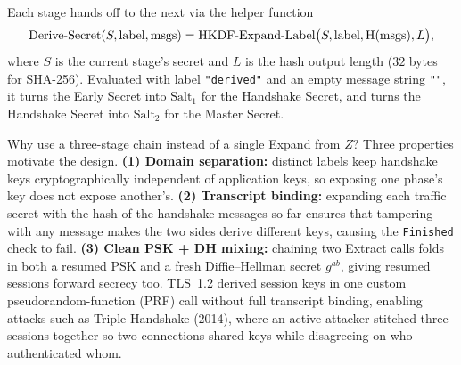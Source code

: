 Each stage hands off to the next via the helper function
\[
\operatorname{Derive\text{-}Secret}(S, \text{label}, \text{msgs})
= \operatorname{HKDF\text{-}Expand\text{-}Label}\bigl(S, \text{label}, \operatorname{H}(\text{msgs}), L\bigr),
\]
where $S$ is the current stage's secret and $L$ is the hash output length ($32$
bytes for SHA-256). Evaluated with label \texttt{"derived"} and an empty message
string \texttt{""}, it turns the Early Secret into $\mathrm{Salt}_1$ for the
Handshake Secret, and turns the Handshake Secret into $\mathrm{Salt}_2$ for the
Master Secret.

\begin{whybox}
Why use a three-stage chain instead of a single Expand from $Z$? Three properties
motivate the design. \textbf{(1) Domain separation:} distinct labels keep handshake
keys cryptographically independent of application keys, so exposing one phase's key
does not expose another's. \textbf{(2) Transcript binding:} expanding each traffic
secret with the hash of the handshake messages so far ensures that tampering with
any message makes the two sides derive different keys, causing the \texttt{Finished}
check to fail. \textbf{(3) Clean PSK + DH mixing:} chaining two Extract calls folds
in both a resumed PSK and a fresh Diffie--Hellman secret $g^{ab}$, giving resumed
sessions forward secrecy too. TLS~1.2 derived session keys in one custom
pseudorandom-function (PRF) call without full transcript binding, enabling attacks
such as Triple Handshake (2014), where an active attacker stitched three sessions
together so two connections shared keys while disagreeing on who authenticated whom.
\end{whybox}

